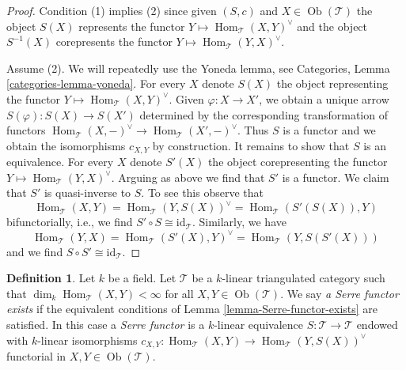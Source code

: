 \documentclass{stacks-project}
\theoremstyle{plain}
\theoremstyle{definition}
\newtheorem{definition}[subsection]{Definition}
\theoremstyle{remark}
\numberwithin{equation}{subsection}
\def\Hom{\mathop{\mathrm{Hom}}\nolimits}
\def\Ob{\mathop{\mathrm{Ob}}\nolimits}
\begin{document}
\begin{proof}
Condition (1) implies (2) since given $(S, c)$ and $X \in \Ob(\mathcal{T})$
the object $S(X)$ represents the functor
$Y \mapsto \Hom_\mathcal{T}(X, Y)^\vee$ and the object $S^{-1}(X)$ corepresents
the functor $Y \mapsto \Hom_\mathcal{T}(Y, X)^\vee$.

\medskip\noindent
Assume (2). We will repeatedly use the Yoneda lemma, see
Categories, Lemma \ref{categories-lemma-yoneda}.
For every $X$ denote $S(X)$ the object representing the
functor $Y \mapsto \Hom_\mathcal{T}(X, Y)^\vee$. Given
$\varphi : X \to X'$, we obtain a unique arrow $S(\varphi) : S(X) \to S(X')$
determined by the corresponding transformation of functors
$\Hom_\mathcal{T}(X, -)^\vee \to \Hom_\mathcal{T}(X', -)^\vee$.
Thus $S$ is a functor and we obtain the isomorphisms $c_{X, Y}$
by construction. It remains to show that $S$ is an equivalence.
For every $X$ denote $S'(X)$ the object corepresenting the
functor $Y \mapsto \Hom_\mathcal{T}(Y, X)^\vee$. Arguing as
above we find that $S'$ is a functor. We claim that $S'$
is quasi-inverse to $S$. To see this observe that
$$
\Hom_\mathcal{T}(X, Y) = \Hom_\mathcal{T}(Y, S(X))^\vee =
\Hom_\mathcal{T}(S'(S(X)), Y)
$$
bifunctorially, i.e., we find $S' \circ S \cong \text{id}_\mathcal{T}$.
Similarly, we have
$$
\Hom_\mathcal{T}(Y, X) = \Hom_\mathcal{T}(S'(X), Y)^\vee =
\Hom_\mathcal{T}(Y, S(S'(X)))
$$
and we find $S \circ S' \cong \text{id}_\mathcal{T}$.
\end{proof}

\begin{definition}
\label{definition-Serre-functor}
Let $k$ be a field. Let $\mathcal{T}$ be a $k$-linear
triangulated category such that $\dim_k \Hom_\mathcal{T}(X, Y) < \infty$
for all $X, Y \in \Ob(\mathcal{T})$. We say {\it a Serre functor
exists} if the equivalent conditions of Lemma \ref{lemma-Serre-functor-exists}
are satisfied. In this case a {\it Serre functor} is a $k$-linear equivalence
$S : \mathcal{T} \to \mathcal{T}$ endowed with $k$-linear isomorphisms
$c_{X, Y} : \Hom_\mathcal{T}(X, Y) \to \Hom_\mathcal{T}(Y, S(X))^\vee$
functorial in $X, Y \in \Ob(\mathcal{T})$.
\end{definition}
\end{document}
